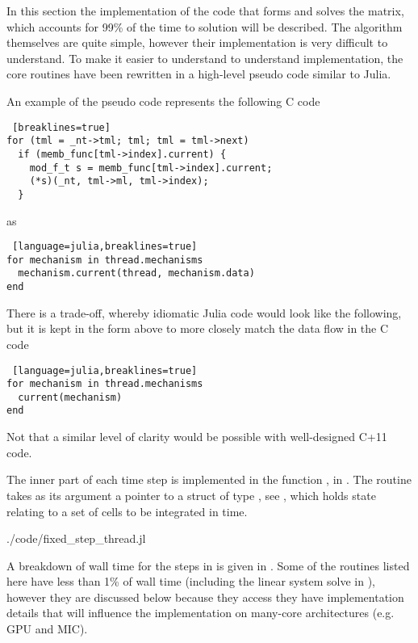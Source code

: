 In this section the implementation of the code that forms and solves the matrix, which accounts for 99\% of the time to solution will be described. The algorithm themselves are quite simple, however their implementation is very difficult to understand. To make it easier to understand to understand implementation, the core routines have been rewritten in a high-level pseudo code similar to Julia.

An example of the pseudo code represents the following C code
\begin{shaded}
\begin{lstlisting} [breaklines=true]
for (tml = _nt->tml; tml; tml = tml->next)
  if (memb_func[tml->index].current) {
    mod_f_t s = memb_func[tml->index].current;
    (*s)(_nt, tml->ml, tml->index);
  }
\end{lstlisting}
\end{shaded}
\noindent as
\begin{shaded}
\begin{lstlisting} [language=julia,breaklines=true]
for mechanism in thread.mechanisms
  mechanism.current(thread, mechanism.data)
end
\end{lstlisting}
\end{shaded}
\noindent There is a trade-off, whereby idiomatic Julia code would look like the following, but it is kept in the form above to more closely match the data flow in the C code
\begin{shaded}
\begin{lstlisting} [language=julia,breaklines=true]
for mechanism in thread.mechanisms
  current(mechanism)
end
\end{lstlisting}
\end{shaded}
\noindent Not that a similar level of clarity would be possible with well-designed C+11 code.

The inner part of each time step is implemented in the function , in . The routine takes as its argument a pointer to a struct of type , see , which holds state relating to a set of cells to be integrated in time.
\begin{shaded}
 {./code/fixed_step_thread.jl}
\end{shaded}

A breakdown of wall time for the steps in  is given in . Some of the routines listed here have less than 1\% of wall time (including the linear system solve in ), however they are discussed below because they access they have implementation details that will influence the implementation on many-core architectures (e.g. GPU and MIC).

